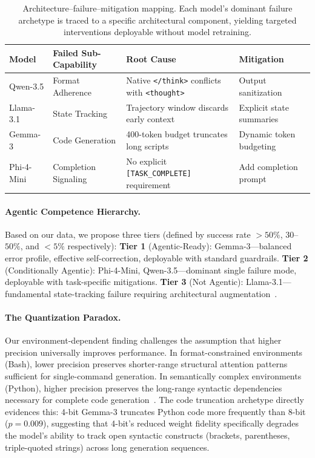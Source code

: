 \documentclass{article}
\begin{document}
\begin{table}[h]
\caption{Architecture--failure--mitigation mapping. Each model's dominant failure archetype is traced to a specific architectural component, yielding targeted interventions deployable without model retraining.}
\label{tab:arch_failure}
\centering
\small
\begin{tabular}{@{}llll@{}}
\toprule
Model & Failed Sub-Capability & Root Cause & Mitigation \\
\midrule
Qwen-3.5 & Format Adherence & Native \texttt{</think>} conflicts with \texttt{<thought>} & Output sanitization \\
Llama-3.1 & State Tracking & Trajectory window discards early context & Explicit state summaries \\
Gemma-3 & Code Generation & 400-token budget truncates long scripts & Dynamic token budgeting \\
Phi-4-Mini & Completion Signaling & No explicit \texttt{[TASK\_COMPLETE]} requirement & Add completion prompt \\
\bottomrule
\end{tabular}
\end{table}

\paragraph{Agentic Competence Hierarchy.}
Based on our data, we propose three tiers (defined by success rate $ > 50\%$, $30$--$50\%$, and $< 5\%$ respectively):
\textbf{Tier 1} (Agentic-Ready): Gemma-3---balanced error profile, effective self-correction, deployable with standard guardrails.
\textbf{Tier 2} (Conditionally Agentic): Phi-4-Mini, Qwen-3.5---dominant single failure mode, deployable with task-specific mitigations.
\textbf{Tier 3} (Not Agentic): Llama-3.1---fundamental state-tracking failure requiring architectural augmentation~\cite{shinn2023reflexion}.

\paragraph{The Quantization Paradox.}
Our environment-dependent finding challenges the assumption that higher precision universally improves performance. In format-constrained environments (Bash), lower precision preserves shorter-range structural attention patterns sufficient for single-command generation. In semantically complex environments (Python), higher precision preserves the long-range syntactic dependencies necessary for complete code generation~\cite{colm2025quantization}. The code truncation archetype directly evidences this: 4-bit Gemma-3 truncates Python code more frequently than 8-bit ($p{=}0.009$), suggesting that 4-bit's reduced weight fidelity specifically degrades the model's ability to track open syntactic constructs (brackets, parentheses, triple-quoted strings) across long generation sequences.
\end{document}
